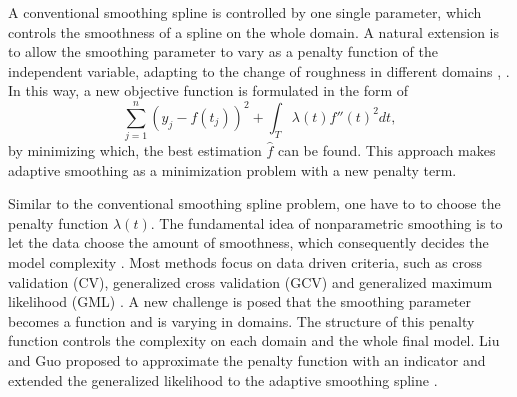 



A conventional smoothing spline is controlled by one single parameter, which controls the smoothness of a spline on the whole domain. A natural extension is to allow the smoothing parameter to vary as a penalty function of the independent variable, adapting to the change of roughness  in different domains \cite{silverman1985some}, \cite{donoho1995wavelet}. In this way, a new objective function is formulated in the form of 
\begin{equation}\label{objective}
\sum_{j=1}^{n}(y_j-f(t_j))^2+\int_T\lambda(t) f''(t)^2dt,
\end{equation}
by minimizing which, the best estimation $\hat{f}$ can be found. This approach makes adaptive smoothing as a minimization problem with a new penalty term. 

Similar to the conventional smoothing spline problem, one have to to choose the penalty function $\lambda(t)$. The fundamental idea of nonparametric smoothing is to let the data choose the amount of smoothness, which consequently decides the model complexity \cite{gu1998model}. Most methods focus on data driven criteria, such as cross validation (CV), generalized cross validation (GCV) \cite{craven1978smoothing} and generalized maximum likelihood (GML) \cite{wahba1985comparison}. A new challenge is posed that the smoothing parameter becomes a function and is varying in domains. The structure of this penalty function controls the complexity on each domain and the whole final model. Liu and Guo proposed to approximate the penalty function with an indicator and extended the generalized likelihood to the adaptive smoothing spline \cite{liu2010data}.


